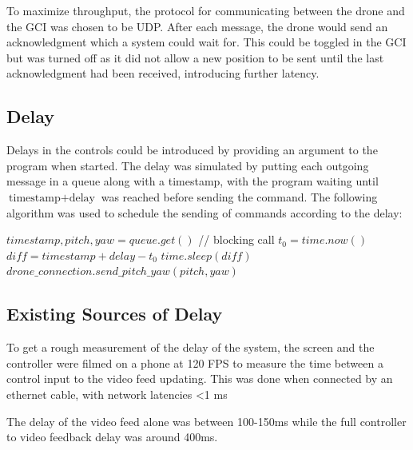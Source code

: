 \documentclass[nofilelist]{cslthse-msc}
\begin{document}
To maximize throughput, the protocol for communicating between the drone and the GCI was chosen to be UDP. After each message, the drone would send an acknowledgment which a system could wait for. This could be toggled in the GCI but was turned off as it did not allow a new position to be sent until the last acknowledgment had been received, introducing further latency.

\subsection{Delay}
Delays in the controls could be introduced by providing an argument to the program when started. The delay was simulated by putting each outgoing message in a queue along with a timestamp, with the program waiting until $ \text{timestamp} + \text{delay} $ was reached before sending the command. The following algorithm was used to schedule the sending of commands according to the delay: 
\begin{algorithmic}
   \State $timestamp, pitch, yaw = queue.get()$ // blocking call
   \State $t_{0} = time.now()$
   \State $diff = timestamp + delay - t_{0}$
      \State $time.sleep(diff)$
   \EndIf
   \State $drone\_connection.send\_pitch\_yaw(pitch, yaw)$
   \EndWhile
\end{algorithmic}

\subsection{Existing Sources of Delay}
To get a rough measurement of the delay of the system, the screen and the controller were filmed on a phone at 120 FPS to measure the time between a control input to the video feed updating. This was done when connected by an ethernet cable, with network latencies <1 ms

The delay of the video feed alone was between 100-150ms while the full controller to video feedback delay was around 400ms. 
\end{document}

